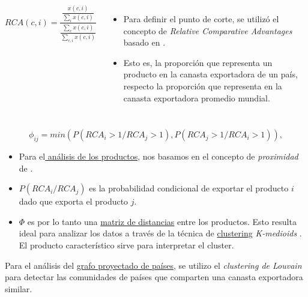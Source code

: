 \documentclass[compress]{beamer}
\begin{document}
\begin{frame}

\begin{columns}[c] 
	
	$$
	RCA(c,i)= \frac{\displaystyle \frac{x(c,i)}{\displaystyle \sum_{i}x(c,i)}}{\frac{\displaystyle\sum_{c}x(c,i)}{\displaystyle \sum_{c,i}x(c,i)}}
	$$	
	
	\small{
	\begin{itemize}[label=\faRebel]
		\item Para definir el punto de corte, se utilizó el concepto de \textit{Relative Comparative Advantages} basado en 	\cite{Hidalgo2009}.
		\item Esto es, la proporción que representa un producto en la canasta exportadora de un país, respecto la proporción que representa en la canasta exportadora promedio mundial.
	\end{itemize}
}
\end{columns}

\end{frame}


\begin{frame}

$$
\phi_{ij} = min (P(RCA_i>1/RCA_j>1),P(RCA_j>1/RCA_i>1)),
$$
	\small
	
\begin{itemize}[label=\faRebel]
	\item Para el\underline{ análisis de los productos}, nos basamos en el concepto de \textit{proximidad} de \cite{Hidalgo2009}.
	\item $P(RCA_i/RCA_j)$ es la probabilidad condicional de exportar el producto $i$ dado que exporta el producto $j$.
	\item $\Phi$ es por lo tanto una \underline{matriz de distancias} entre los productos. Esto resulta ideal para analizar los datos a través de la técnica de \underline{clustering} \textit{K-medioids} \citep{kaufman1987clustering}. El producto característico sirve para interpretar el cluster.
\end{itemize}
	
\end{frame}

\begin{frame}
	Para el análisis del \underline{grafo proyectado de países}, se utilizo el \textit{clustering de Louvain} \citep{blondel2008fast} para detectar las comunidades de países que comparten una canasta exportadora similar.
\end{frame}
\end{document}
